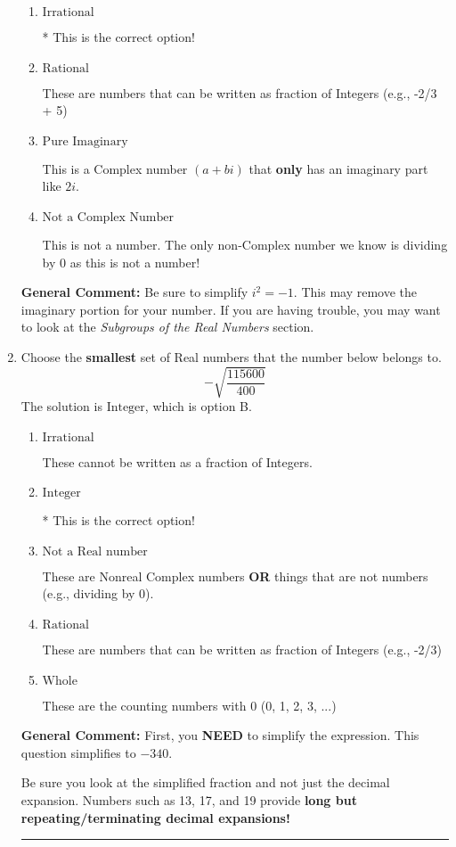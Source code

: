 \documentclass{extbook}[14pt]
\newcommand{\litem}[1]{\item #1

\rule{\textwidth}{0.4pt}}
\begin{document}
\begin{enumerate}
{\begin{enumerate}[label=\Alph*.]
This is a Complex number $(a+bi)$ that is not Real (has $i$ as part of the number).
\item \( \text{Irrational} \)

* This is the correct option!
\item \( \text{Rational} \)

These are numbers that can be written as fraction of Integers (e.g., -2/3 + 5)
\item \( \text{Pure Imaginary} \)

This is a Complex number $(a+bi)$ that \textbf{only} has an imaginary part like $2i$.
\item \( \text{Not a Complex Number} \)

This is not a number. The only non-Complex number we know is dividing by 0 as this is not a number!
\end{enumerate}

\textbf{General Comment:} Be sure to simplify $i^2 = -1$. This may remove the imaginary portion for your number. If you are having trouble, you may want to look at the \textit{Subgroups of the Real Numbers} section.
}
\litem{
Choose the \textbf{smallest} set of Real numbers that the number below belongs to.
\[ -\sqrt{\frac{115600}{400}} \]The solution is \( \text{Integer} \), which is option B.\begin{enumerate}[label=\Alph*.]
\item \( \text{Irrational} \)

These cannot be written as a fraction of Integers.
\item \( \text{Integer} \)

* This is the correct option!
\item \( \text{Not a Real number} \)

These are Nonreal Complex numbers \textbf{OR} things that are not numbers (e.g., dividing by 0).
\item \( \text{Rational} \)

These are numbers that can be written as fraction of Integers (e.g., -2/3)
\item \( \text{Whole} \)

These are the counting numbers with 0 (0, 1, 2, 3, ...)
\end{enumerate}

\textbf{General Comment:} First, you \textbf{NEED} to simplify the expression. This question simplifies to $-340$. 
 
 Be sure you look at the simplified fraction and not just the decimal expansion. Numbers such as 13, 17, and 19 provide \textbf{long but repeating/terminating decimal expansions!} 
 
}
\end{enumerate}
\end{document}
